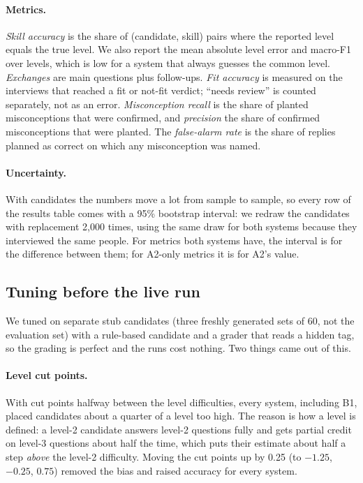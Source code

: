 \documentclass[11pt,a4paper]{article}
\begin{document}
\paragraph{Metrics.} \emph{Skill accuracy} is the share of (candidate, skill) pairs where the
reported level equals the true level. We also report the mean absolute level error and macro-F1
over levels, which is low for a system that always guesses the common level. \emph{Exchanges} are
main questions plus follow-ups. \emph{Fit accuracy} is measured on the interviews that reached a
fit or not-fit verdict; ``needs review'' is counted separately, not as an error.
\emph{Misconception recall} is the share of planted misconceptions that were confirmed, and
\emph{precision} the share of confirmed misconceptions that were planted. The \emph{false-alarm
rate} is the share of replies planned as correct on which any misconception was named.

\paragraph{Uncertainty.} With \nCandidates{} candidates the numbers move a lot from sample to
sample, so every row of the results table comes with a 95\% bootstrap interval: we redraw the
candidates with replacement 2,000 times, using the same draw for both systems because they
interviewed the same people. For metrics both systems have, the interval is for the difference
between them; for A2-only metrics it is for A2's value.

\subsection{Tuning before the live run}
\label{sec:tuning}

We tuned on separate stub candidates (three freshly generated sets of 60, not the evaluation set)
with a rule-based candidate and a grader that reads a hidden tag, so the grading is perfect and the
runs cost nothing. Two things came out of this.

\paragraph{Level cut points.} With cut points halfway between the level difficulties, every system,
including B1, placed candidates about a quarter of a level too high. The reason is how a level is
defined: a level-2 candidate answers level-2 questions fully and gets partial credit on level-3
questions about half the time, which puts their estimate about half a step \emph{above} the level-2 difficulty. Moving the
cut points up by 0.25 (to $-1.25$, $-0.25$, $0.75$) removed the bias and raised accuracy for every
system.
\end{document}
